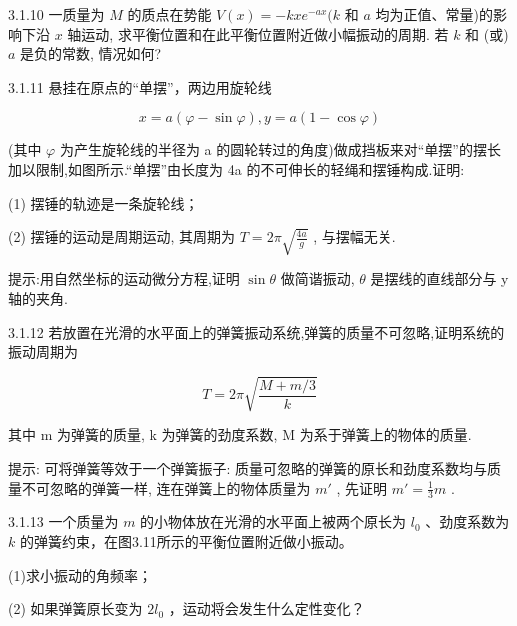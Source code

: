 \begin{problem}{3.1.10}
一质量为 $M$ 的质点在势能 $V(x) = -kxe^{-ax}(k$ 和 $a$ 均为正值、常量)的影响下沿 $x$ 轴运动, 求平衡位置和在此平衡位置附近做小幅振动的周期. 若 $k$ 和 (或) $a$ 是负的常数, 情况如何?
\end{problem}
\clearpage


\begin{problem}{3.1.11}
悬挂在原点的“单摆”，两边用旋轮线

\[
x = a (\varphi - \sin \varphi), y = a (1 - \cos \varphi)
\]

(其中 $\varphi$ 为产生旋轮线的半径为 a 的圆轮转过的角度)做成挡板来对“单摆”的摆长加以限制,如图所示.“单摆”由长度为 4a 的不可伸长的轻绳和摆锤构成.证明:

(1) 摆锤的轨迹是一条旋轮线；

(2) 摆锤的运动是周期运动, 其周期为 $T = 2\pi \sqrt{\frac{4a}{g}}$ , 与摆幅无关.

提示:用自然坐标的运动微分方程,证明 $\sin\theta$ 做简谐振动, $\theta$ 是摆线的直线部分与 y 轴的夹角.
\begin{center}

\end{center}
\end{problem}
\clearpage


\begin{problem}{3.1.12}
若放置在光滑的水平面上的弹簧振动系统,弹簧的质量不可忽略,证明系统的振动周期为

\[
T = 2 \pi \sqrt {\frac {M + m / 3}{k}}
\]

其中 m 为弹簧的质量, k 为弹簧的劲度系数, M 为系于弹簧上的物体的质量.

提示: 可将弹簧等效于一个弹簧振子: 质量可忽略的弹簧的原长和劲度系数均与质量不可忽略的弹簧一样, 连在弹簧上的物体质量为 $m'$ , 先证明 $m' = \frac{1}{3}m$ .
\end{problem}
\clearpage


\begin{problem}{3.1.13}
一个质量为 $m$ 的小物体放在光滑的水平面上被两个原长为 $l_0$ 、劲度系数为 $k$ 的弹簧约束，在图3.11所示的平衡位置附近做小振动。

(1)求小振动的角频率；

(2) 如果弹簧原长变为 $2l_{0}$ ，运动将会发生什么定性变化？
\begin{center}

\end{center}
\end{problem}
\clearpage


